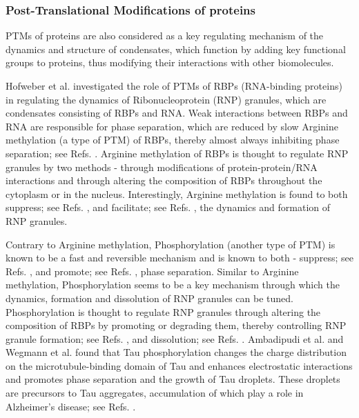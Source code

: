 \subsubsection{Post-Translational Modifications of proteins}

PTMs of proteins are also considered as a key regulating mechanism of the dynamics and structure of condensates, which function by adding key functional groups to proteins, thus modifying their interactions with other biomolecules.

Hofweber et al. \cite{Hofweber2019} investigated the role of PTMs of RBPs (RNA-binding proteins) in regulating the dynamics of Ribonucleoprotein (RNP) granules, which are condensates consisting of RBPs and RNA.
Weak interactions between RBPs and RNA are responsible for phase separation, which are reduced by slow Arginine methylation (a type of PTM) of RBPs, thereby almost always inhibiting phase separation; see Refs. \cite{QAMAR2018720,Ryan2018,NOTT2015936}.
Arginine methylation of RBPs is thought to regulate RNP granules by two methods - through modifications of protein-protein/RNA interactions and through altering the composition of RBPs throughout the cytoplasm or in the nucleus. 
Interestingly, Arginine methylation is found to both suppress; see Refs. \cite{Dolzhanskayaw2006,Tsai2016}, and facilitate; see Refs. \cite{Matsumoto2012,ArribasLayton2016}, the dynamics and formation of RNP granules.

Contrary to Arginine methylation, Phosphorylation (another type of PTM) is known to be a fast and reversible mechanism and is known to both - suppress; see Refs. \cite{Rhoads2018,Wang2018}, and promote; see Refs. \cite{KAMPERS1996344,Vanderweyde8270}, phase separation. 
Similar to Arginine methylation, Phosphorylation seems to be a key mechanism through which the dynamics, formation and dissolution of RNP granules can be tuned.
Phosphorylation is thought to regulate RNP granules through altering the composition of RBPs by promoting or degrading them, thereby controlling RNP granule formation; see Refs. \cite{Sfakianos2018,MAHBOUBI20151725}, and dissolution; see Refs. \cite{Aranda2011,KRISENKO201527803,Reineke2018}. 
Ambadipudi et al. \cite{Ambadipudi2017} and Wegmann et al. \cite{Wegmann2018} found that Tau phosphorylation changes the charge distribution on the microtubule-binding domain of Tau and enhances electrostatic interactions and promotes phase separation and the growth of Tau droplets.
These droplets are precursors to Tau aggregates, accumulation of which play a role in Alzheimer’s disease; see Refs. \cite{Williams2006,Mucke2009}.

